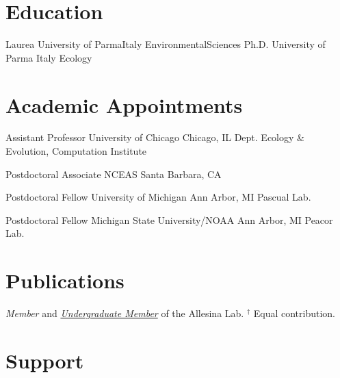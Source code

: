 \documentclass[11pt,letterpaper,sans]{moderncv}
\begin{document}
\makecvtitle

\section{Education}
        {Laurea}
        {University of Parma}{Italy}
        {EnvironmentalSciences}
        {}
        {Ph.D.}
        {University of Parma}
        {Italy}
        {Ecology}
        {}

\section{Academic Appointments}
        {Assistant Professor}
        {University of Chicago}
        {Chicago, IL}
        {Dept. Ecology \& Evolution, Computation Institute}
        {}
        
        {Postdoctoral Associate}
        {NCEAS}
        {Santa Barbara, CA}
        {}
        {}
        
        {Postdoctoral Fellow}
        {University of Michigan}
        {Ann Arbor, MI}
        {Pascual Lab.}
        {}
        
        {Postdoctoral Fellow}
        {Michigan State University/NOAA}
        {Ann Arbor, MI}
        {Peacor Lab.}
        {}

\section{Publications}
\textit{Member} and \textit{\underline{Undergraduate Member}} of the
Allesina Lab. $^\dagger$ Equal contribution.





\section{Support}
\end{document}
